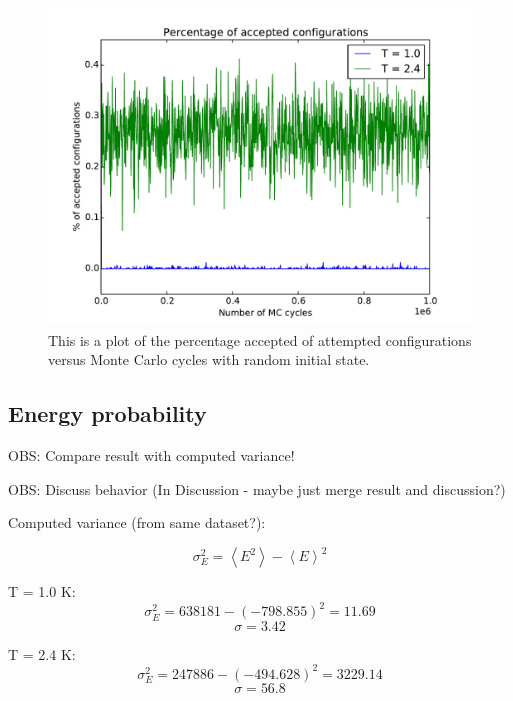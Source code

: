 \begin{figure}[H]
\includegraphics[width=\linewidth]{../results/4c/L_20_accepted_configs}\caption{This is a plot of the percentage accepted of attempted configurations versus  Monte Carlo cycles with random initial state.}\label{fig:percentage_accepted}
\end{figure}

\subsection{Energy probability}

OBS: Compare result with computed variance!

OBS: Discuss behavior (In Discussion - maybe just merge result and discussion?)

Computed variance (from same dataset?):

$$ \sigma_E^2 = \left< E^2\right> - \left< E\right>^2 $$

T = 1.0 K:
$$ \sigma_E^2 = 638181 - (-798.855)^2 = 11.69 $$
$$ \sigma = 3.42 $$

T = 2.4 K:
$$ \sigma_E^2 =   247886 - (-494.628)^2 = 3229.14 $$
$$ \sigma = 56.8  $$

